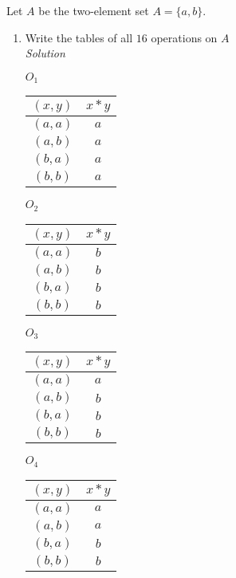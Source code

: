 \documentclass[12pt]{article}
\begin{document}
\noindent Let $A$ be the two-element set $A = \{a,b\}.$
	\begin{enumerate}
	  \item Write the tables of all $16$ operations on $A$ \\
	  \medskip
	  \textit{Solution} \\
	  \medskip
		\begin{minipage}[h]{.25\textwidth}
		$O_1$
      \begin{tabular}{ c | c }
        $(x,y)$ & $x*y$ \\
        \hline
        $(a,a)$ & $a$ \\
        $(a,b)$ & $a$ \\
        $(b,a)$ & $a$ \\
        $(b,b)$ & $a$
      	\end{tabular}
    	\end{minipage}
    	\bigskip
      \begin{minipage}[h]{.25\textwidth}
				$O_2$
    		\begin{tabular}{ c | c }
      		$(x,y)$ & $x*y$ \\
        	\hline
        	$(a,a)$ & $b$ \\
        	$(a,b)$ & $b$ \\
        	$(b,a)$ & $b$ \\
        	$(b,b)$ & $b$
      	\end{tabular}
    	\end{minipage}
      \begin{minipage}[h]{.25\textwidth}
				$O_3$
    		\begin{tabular}{ c | c }
      		$(x,y)$ & $x*y$ \\
        	\hline
        	$(a,a)$ & $a$ \\
        	$(a,b)$ & $b$ \\
        	$(b,a)$ & $b$ \\
        	$(b,b)$ & $b$
      	\end{tabular}
    	\end{minipage}        
      \begin{minipage}[h]{.25\textwidth}
				$O_4$
    		\begin{tabular}{ c | c }
      		$(x,y)$ & $x*y$ \\
        	\hline
        	$(a,a)$ & $a$ \\
        	$(a,b)$ & $a$ \\
        	$(b,a)$ & $b$ \\
        	$(b,b)$ & $b$
      	\end{tabular}

\end{minipage}
\end{enumerate}
\end{document}
